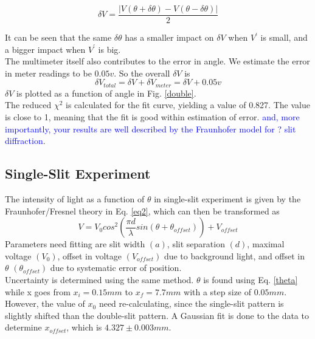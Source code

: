\documentclass[prb,preprint]{revtex4-1}
\begin{document}
\begin{equation}
\delta V = \frac{\left| V(\theta+\delta\theta)-V(\theta-\delta\theta)\right |}{2}
\label{deltav}
\end{equation}

It can be seen that the same $\delta\theta$ has a smaller impact on $\delta V$ when $V^\prime$ is small, and a bigger impact when $V^\prime$ is big.\\

The multimeter itself also contributes to the error in angle. We estimate the error in meter readings to be $0.05v$.
So the overall $\delta V$ is
\begin{equation}
\delta V_{total} = \delta V+\delta V_{meter} = \delta V + 0.05v
\label{deltavtotal}
\end{equation}
$\delta V$ is plotted as a function of angle in Fig. \ref{double}.\\

The reduced $\chi^2$ is calculated for the fit curve, yielding a value of 0.827. The value is close to 1, meaning that the fit is good within estimation of error. \textcolor{blue}{and, more importantly, your results are well described by the Fraunhofer model for ? slit diffraction}. \\

\subsection{Single-Slit Experiment}

The intensity of light as a function of $\theta$ in single-slit experiment is given by the Fraunhofer/Fresnel theory in Eq. \ref{eq2}, which can then be transformed as
\begin{equation}
V=V_0 cos^2(\frac{\pi d}{\lambda} sin (\theta+\theta_{offset})) + V_{offset}
\label{fitsingle}
\end{equation}
Parameters need fitting are slit width $(a)$, slit separation $(d)$, maximal voltage $(V_0)$, offset in voltage $(V_{offset})$ due to background light, and offset in $\theta$ $(\theta_{offset})$ due to systematic error of position.\\

Uncertainty is determined using the same method. $\theta$ is found using Eq. \ref{theta} while x goes from $x_i = 0.15mm$ to $x_f = 7.7mm$ with a step size of $0.05mm$. However, the value of $x_0$ need re-calculating, since the single-slit pattern is slightly shifted than the double-slit pattern. A Gaussian fit is done to the data to determine $x_{offset}$, which is $4.327 \pm 0.003mm$.\\
\end{document}
